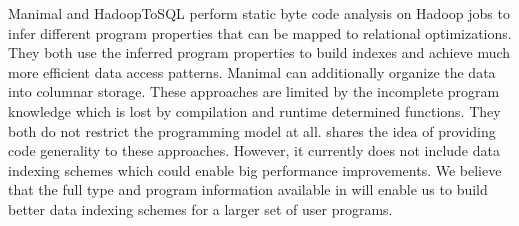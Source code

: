 Manimal \cite{jahani_automatic_2011} and HadoopToSQL \cite{iu_hadooptosql:_2010} perform static byte code analysis on Hadoop jobs to infer different program properties that can be mapped to relational optimizations. They both use the inferred program properties to build indexes and achieve much more efficient data access patterns. Manimal can additionally organize the data into columnar storage. These approaches are limited by the incomplete program knowledge which is lost by compilation and runtime determined functions. They both do not restrict the programming model at all. 
\tool shares the idea of providing code generality to these approaches. However, it currently does not include data indexing schemes which could enable big performance improvements. We believe that the full type and program information available in \tool will enable us to build better data indexing schemes for a larger set of user programs.
